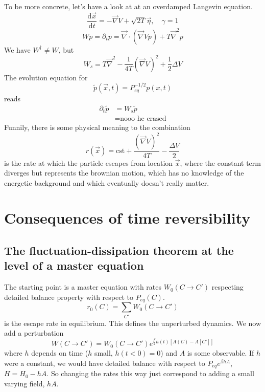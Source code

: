 \documentclass[a4paper]{book}
\theoremstyle{definition}
\theoremstyle{remark}
\begin{document}
To be more concrete, let's have a look at at an overdamped Langevin equation. 
\begin{equation}
    \frac{\text{d}\vec{x}}{\text{d}t} = -\vec{\nabla} V + \sqrt{2T}\vec{\eta}, \quad \gamma = 1
\end{equation}
\begin{equation}
    Wp = \partial_t p = \vec{\nabla}\cdot (\vec{\nabla} Vp) + T\vec{\nabla}^2 p
\end{equation}
We have $W^\dagger \neq W$, but 
\begin{equation}
    W_s = T\vec{\nabla}^2 - \frac{1}{4T}(\vec{\nabla}V)^2 + \frac{1}{2}\Delta V 
\end{equation}
The evolution equation for 
\begin{equation}
    \tilde{p}(\vec{x}, t) = P_{eq}^{-1/2} p(x, t)
\end{equation}
reads 
\begin{equation}
    \begin{aligned}
        \partial_t \tilde{p} &= W_s \tilde{p} \\ 
        &= \text{nooo he erased}
    \end{aligned}
\end{equation}
Funnily, there is some physical meaning to the combination 
\begin{equation}
    r(\vec{x}) = \text{cst} + \frac{(\vec{\nabla}V)^2}{4T} - \frac{\Delta V}{2}
\end{equation}
is the rate at which the particle escapes from location $\vec{x}$, where the constant term diverges but represents the brownian motion, which has no knowledge of the energetic background and which eventually doesn't really matter. 

\section{Consequences of time reversibility}

\subsection{The fluctuation-dissipation theorem at the level of a master equation}

The starting point is a master equation with rates $W_0(C \rightarrow C')$ respecting detailed balance property with respect to $P_{eq}(C)$. 
\begin{equation}
    r_0(C) = \sum_{C'} W_0(C \rightarrow C') 
\end{equation}
is the escape rate in equilibrium. This defines the unperturbed dynamics. We now add a perturbation 
\begin{equation}
    W(C \rightarrow C') = W_0 (C \rightarrow C') e^{\frac{\beta}{2}h(t)[A(C) - A[C']]}
\end{equation}
where $h$ depends on time ($h$ small, $h(t<0) = 0$) and $A$ is some observable. If $h$ were a constant, we would have detailed balance with respect to $P_{eq}e^{\beta h A}$, $H = H_0 - hA$. So changing the rates this way just correspond to adding a small varying field, $hA$. \par \medskip 
\end{document}

